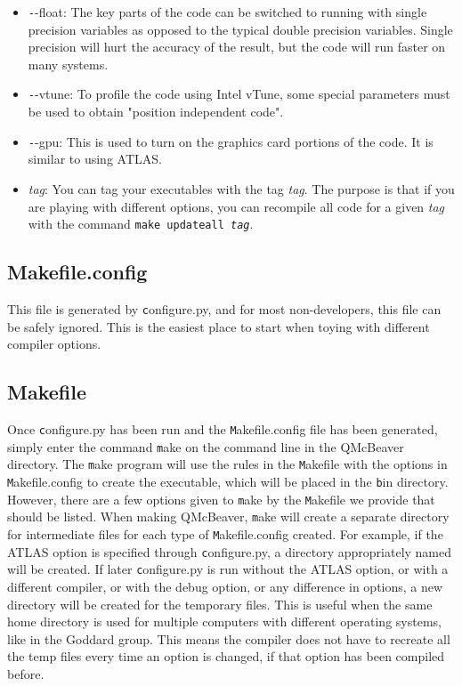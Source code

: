 \documentclass[11pt]{article}
\begin{document}
\begin{enumerate}
\begin{itemize}
\item {\texttt --float}: The key parts of the code can be switched to running with single precision variables as opposed to the typical double precision variables. Single precision will hurt the accuracy of the result, but the code will run faster on many systems.
\item {\texttt --vtune}: To profile the code using Intel vTune, some special parameters must be used to obtain "position independent code".
\item {\texttt --gpu}: This is used to turn on the graphics card portions of the code. It is similar to using ATLAS. 
\item {\it tag}: You can tag your executables with the tag \textit{tag}. The purpose is that if you are playing with different options, you can recompile all code for a given \textit{tag} with the command \texttt{make updateall \textit{tag}}.
\end{itemize}
\end{enumerate}

\subsection{Makefile.config}
This file is generated by {\texttt configure.py}, and for most non-developers, this file can be safely ignored. This is the easiest place to start when toying with different compiler options.

\subsection{Makefile}
Once {\texttt configure.py} has been run and the {\texttt Makefile.config} file has been generated, simply enter the command {\texttt make} on the command line in the QMcBeaver directory. The {\texttt make} program will use the rules in the {\texttt Makefile} with the options in {\texttt Makefile.config} to create the executable, which will be placed in the {\texttt bin} directory. However, there are a few options given to {\texttt make} by the {\texttt Makefile} we provide that should be listed. When making QMcBeaver, {\texttt make} will create a separate directory for intermediate files for each type of {\texttt Makefile.config} created. For example, if the ATLAS option is specified through {\texttt configure.py}, a directory appropriately named will be created. If later {\texttt configure.py} is run without the ATLAS option, or with a different compiler, or with the debug option, or any difference in options, a new directory will be created for the temporary files. This is useful when the same home directory is used for multiple computers with different operating systems, like in the Goddard group. This means the compiler does not have to recreate all the temp files every time an option is changed, if that option has been compiled before.
\end{document}
